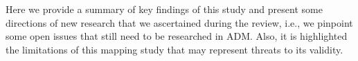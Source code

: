 Here we provide a summary of key findings of this study and present some directions of new research that we ascertained during the review, i.e., we pinpoint some open issues that still need to be researched in ADM. Also, it is highlighted the limitations of this mapping study that may represent threats to its validity.
